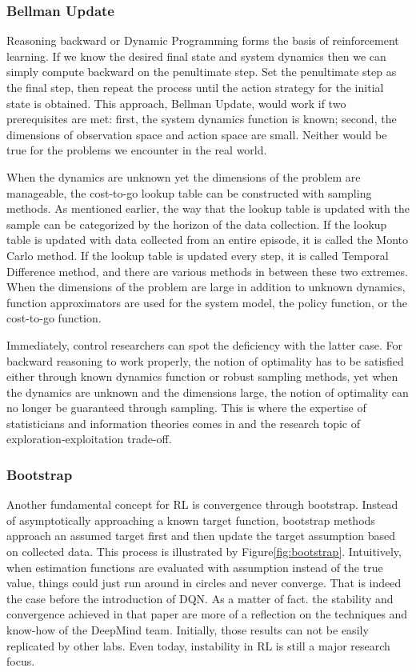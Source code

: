 \documentclass[journal]{IEEEtran}
\begin{document}
\subsubsection{Bellman Update}

Reasoning backward or Dynamic Programming forms the basis of reinforcement learning. If we know the desired final state and system dynamics then we can simply compute backward on the penultimate step. Set the penultimate step as the final step, then repeat the process until the action strategy for the initial state is obtained. This approach, Bellman Update, would work if two prerequisites are met: first, the system dynamics function is known; second, the dimensions of observation space and action space are small. Neither would be true for the problems we encounter in the real world.

When the dynamics are unknown yet the dimensions of the problem are manageable, the cost-to-go lookup table can be constructed with sampling methods. As mentioned earlier, the way that the lookup table is updated with the sample can be categorized by the horizon of the data collection. If the lookup table is updated with data collected from an entire episode, it is called the Monto Carlo method. If the lookup table is updated every step, it is called Temporal Difference method, and there are various methods in between these two extremes. When the dimensions of the problem are large in addition to unknown dynamics, function approximators are used for the system model, the policy function, or the cost-to-go function. 

Immediately, control researchers can spot the deficiency with the latter case. For backward reasoning to work properly, the notion of optimality has to be satisfied either through known dynamics function or robust sampling methods, yet when the dynamics are unknown and the dimensions large, the notion of optimality can no longer be guaranteed through sampling. This is where the expertise of statisticians and information theories comes in and the research topic of exploration-exploitation trade-off.

\subsubsection{Bootstrap}

Another fundamental concept for RL is convergence through bootstrap. Instead of asymptotically approaching a known target function, bootstrap methods approach an assumed target first and then update the target assumption based on collected data. This process is illustrated by Figure\ref{fig:bootstrap}. Intuitively, when estimation functions are evaluated with assumption instead of the true value, things could just run around in circles and never converge. That is indeed the case before the introduction of DQN\cite{Osband2016DeepEV}. As a matter of fact. the stability and convergence achieved in that paper are more of a reflection on the techniques and know-how of the DeepMind team. Initially, those results can not be easily replicated by other labs. Even today, instability in RL is still a major research focus. 
\end{document}
